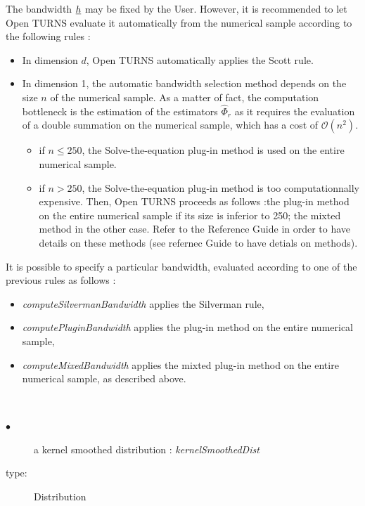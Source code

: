 The bandwidth ${\underline{h}}$ may be fixed by the User. However, it is recommended to let Open TURNS evaluate it automatically from the numerical sample according to the following rules :
\begin{itemize}
\item In dimension $d$, Open TURNS automatically applies the Scott rule.
\item In dimension 1, the automatic bandwidth selection method depends  on the size $n$ of the numerical sample. As a matter of fact, the computation bottleneck is the estimation of the estimators $\hat{\Phi}_r$ as it requires the evaluation of a double summation on the numerical sample, which has a cost of $\mathcal{O}(n^2)$.
  \begin{itemize}
  \item if $n \leq 250$, the Solve-the-equation  plug-in method is used on the entire numerical sample.
  \item if $n>250$, the Solve-the-equation  plug-in method is too computationnally expensive. Then, Open TURNS proceeds as follows :the plug-in method on the entire numerical sample if its size is inferior to 250; the mixted method in the other case. Refer to the Reference Guide in order to have details on these methods (see refernec Guide to have detials on methods).
  \end{itemize}
\end{itemize}


It is possible to specify a particular bandwidth, evaluated according to one of the previous rules as follows :
\begin{itemize}
\item \emph{computeSilvermanBandwidth} applies the Silverman rule,
\item \emph{computePluginBandwidth} applies the plug-in method on the entire numerical sample,
\item \emph{computeMixedBandwidth} applies the mixted plug-in method on the entire numerical sample, as described above.
\end{itemize}

\textspace\\
{
  \begin{description}
  \item[$\bullet$] a kernel smoothed distribution : {\itshape kernelSmoothedDist}
  \item[type:]  Distribution
  \end{description}
}

